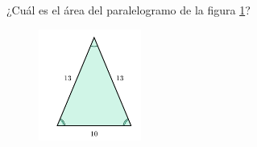 \question[15]  ¿Cuál es el \'area del paralelogramo de la figura \ref{fig:area_isoseles_02}?
\begin{figure}[H]
    \begin{center}
        \includegraphics[width=0.3\textwidth]{../images/area_isoseles_02.png}
    \end{center}
    \caption{}
    \label{fig:area_isoseles_02}
\end{figure}